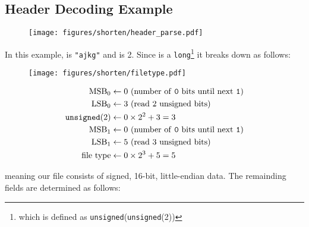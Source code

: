 \clearpage

\subsection{Header Decoding Example}

\begin{figure}[h]
\texttt{[image: figures/shorten/header\_parse.pdf]}
\end{figure}
In this example,  is \texttt{"ajkg"} and
 is 2.
Since  is a \texttt{long}\footnote{which is defined as
\texttt{unsigned}(\texttt{unsigned}(2))}
it breaks down as follows:
\par
\noindent
\begin{wrapfigure}[3]{r}{140pt}
\texttt{[image: figures/shorten/filetype.pdf]}
\end{wrapfigure}
{
\begin{align*}
\text{MSB}_0 &\leftarrow 0
\text{ (number of \texttt{0} bits until next \texttt{1})} \\
\text{LSB}_0 &\leftarrow 3
\text{ (read 2 unsigned bits)} \\
\texttt{unsigned}(2) &\leftarrow 0 \times 2 ^ 2 + 3 = 3 \\
\text{MSB}_1 &\leftarrow 0
\text{ (number of \texttt{0} bits until next \texttt{1})} \\
\text{LSB}_1 &\leftarrow 5
\text{ (read 3 unsigned bits)} \\
\text{file type} &\leftarrow 0 \times 2 ^ 3 + 5 = 5 \\
\end{align*}
}
\par
\noindent
meaning our file consists of signed, 16-bit, little-endian data.
The remainding fields are determined as follows:
